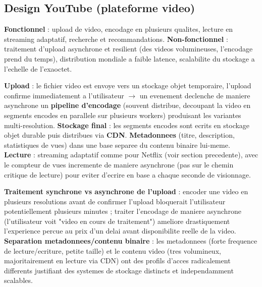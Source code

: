 \documentclass[11pt,a4paper]{article}
\newenvironment{sujet}[1]{%
  \subsection{#1}
}{%
  \bigskip
}
\begin{document}
\begin{sujet}{Design YouTube (plateforme video)}

\begin{req}
\textbf{Fonctionnel} : upload de video, encodage en plusieurs qualites, lecture en streaming adaptatif, recherche et recommandations. \textbf{Non-fonctionnel} : traitement d'upload asynchrone et resilient (des videos volumineuses, l'encodage prend du temps), distribution mondiale a faible latence, scalabilite du stockage a l'echelle de l'exaoctet.
\end{req}

\begin{archbox}
\textbf{Upload} : le fichier video est envoye vers un stockage objet temporaire, l'upload confirme immediatement a l'utilisateur $\to$ un evenement declenche de maniere asynchrone un \textbf{pipeline d'encodage} (souvent distribue, decoupant la video en segments encodes en parallele sur plusieurs workers) produisant les variantes multi-resolution. \textbf{Stockage final} : les segments encodes sont ecrits en stockage objet durable puis distribues via \textbf{CDN}. \textbf{Metadonnees} (titre, description, statistiques de vues) dans une base separee du contenu binaire lui-meme. \textbf{Lecture} : streaming adaptatif comme pour Netflix (voir section precedente), avec le compteur de vues incremente de maniere asynchrone (pas sur le chemin critique de lecture) pour eviter d'ecrire en base a chaque seconde de visionnage.
\end{archbox}

\begin{tradeoff}
\textbf{Traitement synchrone vs asynchrone de l'upload} : encoder une video en plusieurs resolutions avant de confirmer l'upload bloquerait l'utilisateur potentiellement plusieurs minutes ; traiter l'encodage de maniere asynchrone (l'utilisateur voit "video en cours de traitement") ameliore drastiquement l'experience percue au prix d'un delai avant disponibilite reelle de la video. \textbf{Separation metadonnees/contenu binaire} : les metadonnees (forte frequence de lecture/ecriture, petite taille) et le contenu video (tres volumineux, majoritairement en lecture via CDN) ont des profils d'acces radicalement differents justifiant des systemes de stockage distincts et independamment scalables.
\end{tradeoff}

\end{sujet}
\end{document}
